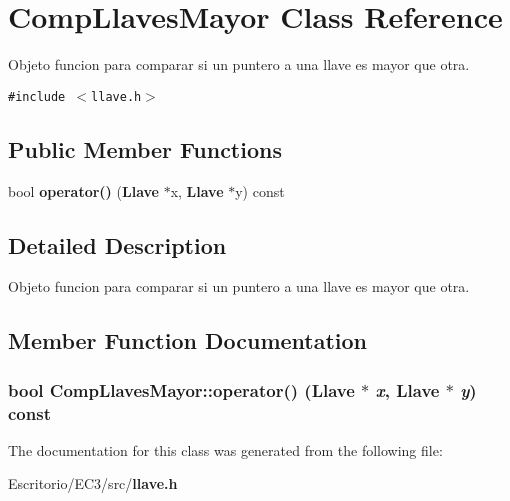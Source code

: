 \section{CompLlavesMayor Class Reference}
\label{classCompLlavesMayor}
Objeto funcion para comparar si un puntero a una llave es mayor que otra.  


{\tt \#include $<$llave.h$>$}

\subsection*{Public Member Functions}
\begin{CompactItemize}
\item 
bool {\bf operator()} ({\bf Llave} $\ast$x, {\bf Llave} $\ast$y) const
\end{CompactItemize}


\subsection{Detailed Description}
Objeto funcion para comparar si un puntero a una llave es mayor que otra. 



\subsection{Member Function Documentation}
\subsubsection{\setlength{\rightskip}{0pt plus 5cm}bool CompLlavesMayor::operator() ({\bf Llave} $\ast$ {\em x}, {\bf Llave} $\ast$ {\em y}) const\hspace{0.3cm}{\tt  [inline]}}\label{classCompLlavesMayor_f703cdd5a443ff24b8a4b6d2e5317e34}




The documentation for this class was generated from the following file:\begin{CompactItemize}
\item 
Escritorio/EC3/src/{\bf llave.h}\end{CompactItemize}

